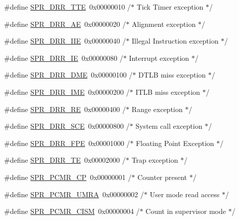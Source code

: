 \begin{DoxyCompactItemize}
\item 
\#define \hyperlink{spr-defs_8h_a2e5b15c93d9551f7c9560beb1b150388}{\-S\-P\-R\-\_\-\-D\-R\-R\-\_\-\-T\-T\-E}~0x00000010  /$\ast$ Tick Timer exception $\ast$/
\item 
\#define \hyperlink{spr-defs_8h_a1eca0c24fd862d7cdc9e4056369e6120}{\-S\-P\-R\-\_\-\-D\-R\-R\-\_\-\-A\-E}~0x00000020  /$\ast$ Alignment exception $\ast$/
\item 
\#define \hyperlink{spr-defs_8h_a3b6f28c9d8f140eb046f551a5c75c39a}{\-S\-P\-R\-\_\-\-D\-R\-R\-\_\-\-I\-I\-E}~0x00000040  /$\ast$ Illegal Instruction exception $\ast$/
\item 
\#define \hyperlink{spr-defs_8h_a5c11b1b617f0aead6d34800f7db4c3d1}{\-S\-P\-R\-\_\-\-D\-R\-R\-\_\-\-I\-E}~0x00000080  /$\ast$ Interrupt exception $\ast$/
\item 
\#define \hyperlink{spr-defs_8h_ac7ba540d7595da16560bf20a25f61355}{\-S\-P\-R\-\_\-\-D\-R\-R\-\_\-\-D\-M\-E}~0x00000100  /$\ast$ D\-T\-L\-B miss exception $\ast$/
\item 
\#define \hyperlink{spr-defs_8h_a532a1222a97c0556f854bc5edb858fcf}{\-S\-P\-R\-\_\-\-D\-R\-R\-\_\-\-I\-M\-E}~0x00000200  /$\ast$ I\-T\-L\-B miss exception $\ast$/
\item 
\#define \hyperlink{spr-defs_8h_a04bff0b8e376a237844a1071c90ce840}{\-S\-P\-R\-\_\-\-D\-R\-R\-\_\-\-R\-E}~0x00000400  /$\ast$ Range exception $\ast$/
\item 
\#define \hyperlink{spr-defs_8h_a6ed573c75c5dfcb23cd14587d5267e48}{\-S\-P\-R\-\_\-\-D\-R\-R\-\_\-\-S\-C\-E}~0x00000800  /$\ast$ System call exception $\ast$/
\item 
\#define \hyperlink{spr-defs_8h_aea52311af6cf3a5ed04d846d829e9f5c}{\-S\-P\-R\-\_\-\-D\-R\-R\-\_\-\-F\-P\-E}~0x00001000  /$\ast$ Floating Point Exception $\ast$/
\item 
\#define \hyperlink{spr-defs_8h_a0af878c7d21873d9f07ba68b6407c518}{\-S\-P\-R\-\_\-\-D\-R\-R\-\_\-\-T\-E}~0x00002000  /$\ast$ Trap exception $\ast$/
\item 
\#define \hyperlink{spr-defs_8h_ae1f796838009ab99a30066073d237c4e}{\-S\-P\-R\-\_\-\-P\-C\-M\-R\-\_\-\-C\-P}~0x00000001  /$\ast$ Counter present $\ast$/
\item 
\#define \hyperlink{spr-defs_8h_abb9da386e77defd589323d680a6fe3a1}{\-S\-P\-R\-\_\-\-P\-C\-M\-R\-\_\-\-U\-M\-R\-A}~0x00000002  /$\ast$ User mode read access $\ast$/
\item 
\#define \hyperlink{spr-defs_8h_a470d0ecedf4166a394fe6fb31844e85e}{\-S\-P\-R\-\_\-\-P\-C\-M\-R\-\_\-\-C\-I\-S\-M}~0x00000004  /$\ast$ Count in supervisor mode $\ast$/

\end{DoxyCompactItemize}

